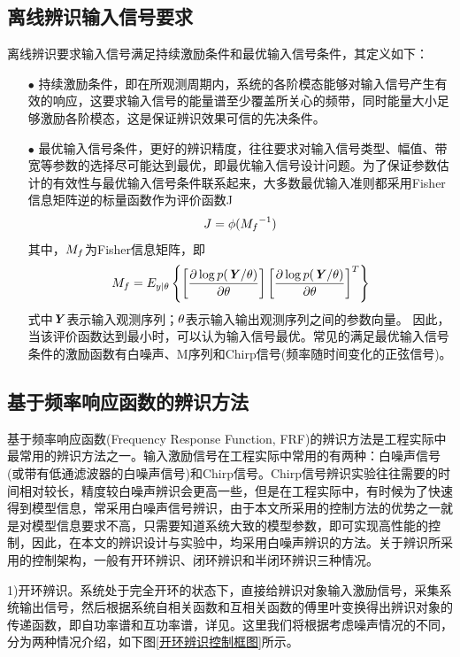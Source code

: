 \subsection{离线辨识输入信号要求}
离线辨识要求输入信号满足持续激励条件和最优输入信号条件，其定义如下：
\begin{enumerate}
	\item[$\bullet$]持续激励条件，即在所观测周期内，系统的各阶模态能够对输入信号产生有效的响应，这要求输入信号的能量谱至少覆盖所关心的频带，同时能量大小足够激励各阶模态，这是保证辨识效果可信的先决条件\cite{刘金琨2013系统辨识理论及}。
	\item[$\bullet$]最优输入信号条件，更好的辨识精度，往往要求对输入信号类型、幅值、带宽等参数的选择尽可能达到最优，即最优输入信号设计问题。为了保证参数估计的有效性与最优输入信号条件联系起来，大多数最优输入准则都采用Fisher信息矩阵逆的标量函数作为评价函数J
	$$J=\phi(\textbf{\emph{$M_f$}}^{-1})$$
	其中，$\textbf{\emph{$M_f$}}$为Fisher信息矩阵，即$$\textbf{\emph{$M_f$}}=E_{\textbf{\emph{$y$}}|\textbf{\emph{$\theta$}}}\left\{\left[\frac{\partial \log p(\textbf{\emph{Y}}/\textbf{\emph{$\theta$}})}{\partial\textbf{\emph{$\theta$}}}\right]{\left[\frac{\partial \log p(\textbf{\emph{Y}}/\textbf{\emph{$\theta$}})}{\partial\textbf{\emph{$\theta$}}}\right]}^T\right\}$$
	式中$\textbf{\textit{Y}}$表示输入观测序列；$\textbf{\textit{$ \theta $}}$表示输入输出观测序列之间的参数向量。
	因此，当该评价函数达到最小时，可以认为输入信号最优。常见的满足最优输入信号条件的激励函数有白噪声、M序列和Chirp信号(频率随时间变化的正弦信号)。
\end{enumerate}
\subsection{基于频率响应函数的辨识方法}
基于频率响应函数(Frequency Response Function, FRF)的辨识方法是工程实际中最常用的辨识方法之一。输入激励信号在工程实际中常用的有两种：白噪声信号(或带有低通滤波器的白噪声信号)和Chirp信号。Chirp信号辨识实验往往需要的时间相对较长，精度较白噪声辨识会更高一些，但是在工程实际中，有时候为了快速得到模型信息，常采用白噪声信号辨识，由于本文所采用的控制方法的优势之一就是对模型信息要求不高，只需要知道系统大致的模型参数，即可实现高性能的控制，因此，在本文的辨识设计与实验中，均采用白噪声辨识的方法。关于辨识所采用的控制架构，一般有开环辨识、闭环辨识和半闭环辨识三种情况\cite{付雪微0有铁芯直线电机推力波动的分析与补偿方法研究}。

1)开环辨识。系统处于完全开环的状态下，直接给辨识对象输入激励信号，采集系统输出信号，然后根据系统自相关函数和互相关函数的傅里叶变换得出辨识对象的传递函数，即自功率谱和互功率谱，详见\cite{荣l1990系统辨识}。这里我们将根据考虑噪声情况的不同，分为两种情况介绍，如下图\ref{开环辨识控制框图}所示。

